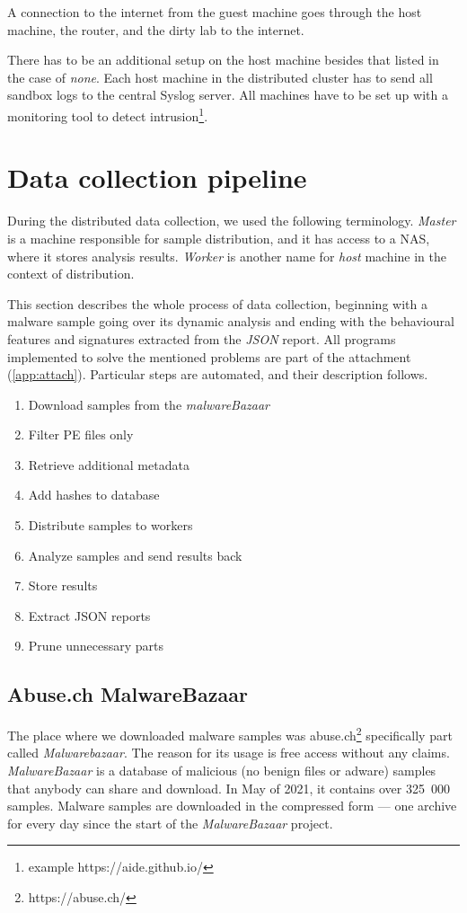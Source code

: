 A connection to the internet from the guest machine goes through the host machine, the router, and the dirty lab to the internet. 

There has to be an additional setup on the host machine besides that listed in the case of \emph{none}. Each host machine in the distributed cluster has to send all sandbox logs to the central Syslog server. All machines have to be set up with a monitoring tool to detect intrusion\footnote{example https://aide.github.io/}.

\section{Data collection pipeline}
During the distributed data collection, we used the following terminology. \emph{Master} is a machine responsible for sample distribution, and it has access to a NAS, where it stores analysis results. \emph{Worker} is another name for \emph{host} machine in the context of distribution.

This section describes the whole process of data collection, beginning with a malware sample going over its dynamic analysis and ending with the behavioural features and signatures extracted from the \emph{JSON} report. All programs implemented to solve the mentioned problems are part of the attachment (\ref{app:attach}). Particular steps are automated, and their description follows.

\begin{enumerate}
    \itemsep0em 
    \item Download samples from the \emph{malwareBazaar}
    \item Filter PE files only
    \item Retrieve additional metadata
    \item Add hashes to database
    \item Distribute samples to workers
    \item Analyze samples and send results back
    \item Store results
    \item Extract JSON reports
    \item Prune unnecessary parts
\end{enumerate}


\subsection{Abuse.ch MalwareBazaar}
The place where we downloaded malware samples was abuse.ch\footnote{https://abuse.ch/} specifically part called \emph{Malwarebazaar}. The reason for its usage is free access without any claims. \emph{MalwareBazaar} is a database of malicious (no benign files or adware) samples that anybody can share and download. In May of 2021, it contains over 325~000 samples. Malware samples are downloaded in the compressed form --- one archive for every day since the start of the \emph{MalwareBazaar} project.

